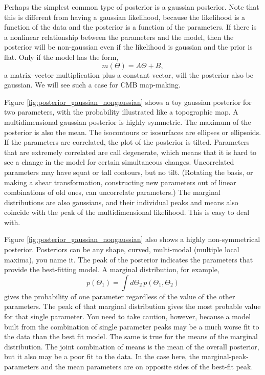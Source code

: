Perhaps the simplest common type of posterior is a gaussian posterior.  Note that this is different from having a gaussian likelihood, because the likelihood is a function of the data and the posterior is a function of the parameters.  If there is a nonlinear relationship between the parameters and the model, then the posterior will be non-gaussian even if the likelihood is gaussian and the prior is flat.  Only if the model has the form,
\begin{equation}
  m(\Theta) = A \Theta + B,
\end{equation}
a matrix--vector multiplication plus a constant vector, will the posterior also be gaussian.  We will see such a case for CMB map-making.

Figure \ref{fig:posterior_gaussian_nongaussian} shows a toy gaussian posterior for two parameters, with the probability illustrated like a topographic map.  A multidimensional gaussian posterior is highly symmetric.  The maximum of the posterior is also the mean.  The isocontours or isosurfaces are ellipses or ellipsoids.  If the parameters are correlated, the plot of the posterior is tilted.  Parameters that are extremely correlated are call degenerate, which means that it is hard to see a change in the model for certain simultaneous changes.  Uncorrelated parameters may have squat or tall contours, but no tilt. (Rotating the basis, or making a shear transformation, constructing new parameters out of linear combinations of old ones, can uncorrelate parameters.)  The marginal distributions are also gaussians, and their individual peaks and means also coincide with the peak of the multidimensional likelihood.  This is easy to deal with.

Figure \ref{fig:posterior_gaussian_nongaussian} also shows a highly non-symmetrical posterior.  Posteriors can be any shape, curved, multi-modal (multiple local maxima), you name it.   The peak of the posterior indicates the parameters that provide the best-fitting model.  A marginal distribution, for example,
\begin{equation}p(\Theta_1) = \int d\Theta_2  \,p(\Theta_1,\Theta_2)\end{equation}
gives the probability of one parameter regardless of the value of the other parameters.  The peak of that marginal distribution gives the most probable value for that single parameter.  You need to take caution, however, because a model built from the combination of single parameter peaks may be a much worse fit to the data than the best fit model.  The same is true for the means of the marginal distribution.  The joint combination of means is the mean of the overall posterior, but it also may be a poor fit to the data.  In the case here, the marginal-peak-parameters and the mean parameters are on opposite sides of the best-fit peak.

